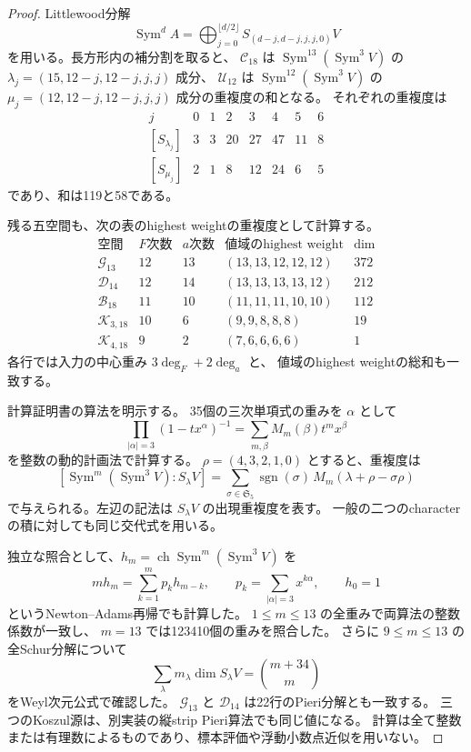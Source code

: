 \documentclass[a4paper,11pt]{ltjsarticle}
\theoremstyle{definition}
\begin{document}
\begin{proof}
Littlewood分解
\[
\operatorname{Sym}^d A=
\bigoplus_{j=0}^{\lfloor d/2\rfloor}
 S_{(d-j,d-j,j,j,0)}V
\]
を用いる。長方形内の補分割を取ると、
$\mathcal C_{18}$ は
$\operatorname{Sym}^{13}(\operatorname{Sym}^3V)$ の
$\lambda_j=(15,12-j,12-j,j,j)$ 成分、
$\mathcal U_{12}$ は
$\operatorname{Sym}^{12}(\operatorname{Sym}^3V)$ の
$\mu_j=(12,12-j,12-j,j,j)$ 成分の重複度の和となる。
それぞれの重複度は
\[
\begin{array}{c|rrrrrrr}
j&0&1&2&3&4&5&6\\\hline
[S_{\lambda_j}]&3&3&20&27&47&11&8\\
{}[S_{\mu_j}]&2&1&8&12&24&6&5
\end{array}
\]
であり、和は119と58である。

残る五空間も、次の表のhighest weightの重複度として計算する。
\[
\begin{array}{c|rr|c|r}
\text{空間}&F\text{次数}&a\text{次数}&\text{値域のhighest weight}&\dim\\\hline
\mathcal G_{13}&12&13&(13,13,12,12,12)&372\\
\mathcal D_{14}&12&14&(13,13,13,13,12)&212\\
\mathcal B_{18}&11&10&(11,11,11,10,10)&112\\
\mathcal K_{3,18}&10&6&(9,9,8,8,8)&19\\
\mathcal K_{4,18}&9&2&(7,6,6,6,6)&1
\end{array}
\]
各行では入力の中心重み $3\deg_F+2\deg_a$ と、
値域のhighest weightの総和も一致する。

計算証明書の算法を明示する。
35個の三次単項式の重みを $\alpha$ として
\[
 \prod_{|\alpha|=3}(1-tx^\alpha)^{-1}
 =\sum_{m,\beta}M_m(\beta)t^mx^\beta
\]
を整数の動的計画法で計算する。
$\rho=(4,3,2,1,0)$ とすると、重複度は
\[
 [\operatorname{Sym}^m(\operatorname{Sym}^3V):S_\lambda V]
 =\sum_{\sigma\in\mathfrak S_5}
  \operatorname{sgn}(\sigma)\,
  M_m(\lambda+\rho-\sigma\rho)
\]
で与えられる。左辺の記法は $S_\lambda V$ の出現重複度を表す。
一般の二つのcharacterの積に対しても同じ交代式を用いる。

独立な照合として、$h_m=\operatorname{ch}\operatorname{Sym}^m
(\operatorname{Sym}^3V)$ を
\[
 m h_m=\sum_{k=1}^m p_kh_{m-k},\qquad
 p_k=\sum_{|\alpha|=3}x^{k\alpha},\qquad h_0=1
\]
というNewton--Adams再帰でも計算した。
$1\le m\le13$ の全重みで両算法の整数係数が一致し、
$m=13$ では123410個の重みを照合した。
さらに $9\le m\le13$ の全Schur分解について
\[
 \sum_\lambda m_\lambda\dim S_\lambda V=\binom{m+34}{m}
\]
をWeyl次元公式で確認した。
$\mathcal G_{13}$ と $\mathcal D_{14}$ は22行のPieri分解とも一致する。
三つのKoszul源は、別実装の縦strip Pieri算法でも同じ値になる。
計算は全て整数または有理数によるものであり、標本評価や浮動小数点近似を用いない。
\end{proof}
\end{document}
